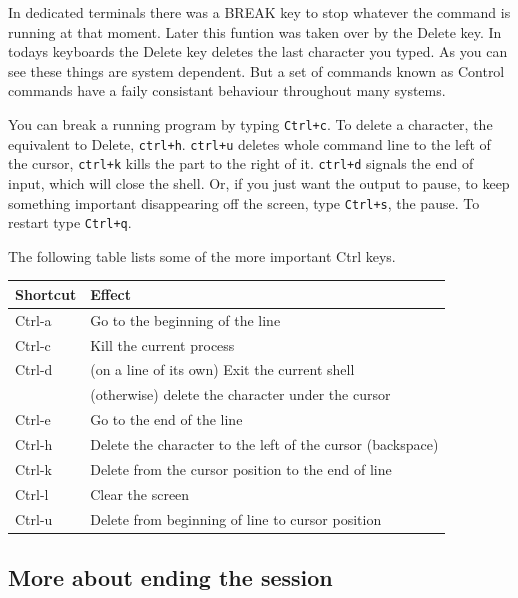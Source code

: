 \documentclass[11pt,a4paper,twoside]{article}
\begin{document}
In dedicated terminals there was a BREAK key to stop whatever the command
is running at that moment. Later this funtion was taken over by the
Delete key. In todays keyboards the Delete key deletes the last character 
you typed. As you can see these things are system dependent. But a set
of commands known as Control commands have a faily consistant behaviour
throughout many systems.

You can break a running program by typing \texttt{Ctrl+c}. To delete a
character, the equivalent to Delete, \texttt{ctrl+h}. \texttt{ctrl+u}
deletes whole command line to the left of the cursor, \texttt{ctrl+k}
kills the part to the right of it. \texttt{ctrl+d} signals the end of
input, which will close the shell. Or, if you just want the output to 
pause, to keep something important disappearing off the screen, type 
\texttt{Ctrl+s}, the pause. To restart type \texttt{Ctrl+q}.

The following table lists some of the more important Ctrl keys.
\begin{center}
\begin{tabular}{ l | l }
\hline
Shortcut & Effect \\
\hline
Ctrl-a & Go to the beginning of the line \\
Ctrl-c & Kill the current process \\
Ctrl-d & (on a line of its own) Exit the current shell \\
 & (otherwise) delete the character under the cursor \\
Ctrl-e & Go to the end of the line \\
Ctrl-h & Delete the character to the left of the cursor (backspace) \\
Ctrl-k & Delete from the cursor position to the end of line \\
Ctrl-l & Clear the screen \\
Ctrl-u & Delete from beginning of line to cursor position \\
\hline
\end{tabular}
\end{center}

\subsection{More about ending the session}
\end{document}
